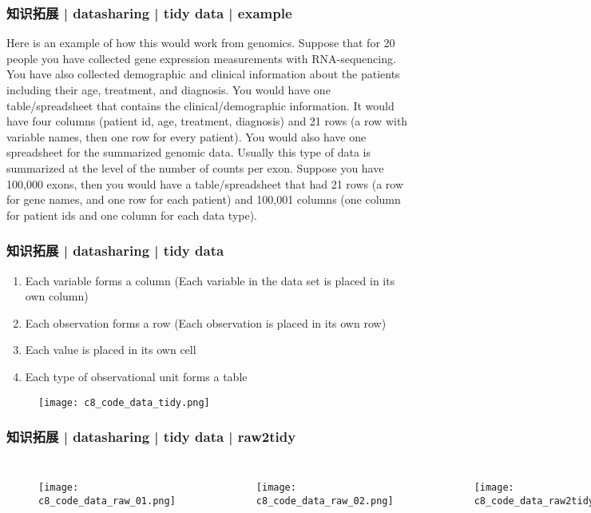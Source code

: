 \begin{frame}
  \frametitle{知识拓展 | datasharing | tidy data | example}
  Here is an example of how this would work from genomics. Suppose that for 20 people you have collected gene expression measurements with RNA-sequencing. You have also collected demographic and clinical information about the patients including their age, treatment, and diagnosis. You would have one table/spreadsheet that contains the clinical/demographic information. It would have four columns (patient id, age, treatment, diagnosis) and 21 rows (a row with variable names, then one row for every patient). You would also have one spreadsheet for the summarized genomic data. Usually this type of data is summarized at the level of the number of counts per exon. Suppose you have 100,000 exons, then you would have a table/spreadsheet that had 21 rows (a row for gene names, and one row for each patient) and 100,001 columns (one column for patient ids and one column for each data type). 
\end{frame}

\begin{frame}
  \frametitle{知识拓展 | datasharing | tidy data}
  \begin{enumerate}
    \item Each variable forms a column (Each variable in the data set is placed in its own column)
    \item Each observation forms a row (Each observation is placed in its own row)
    \item Each value is placed in its own cell
    \item Each type of observational unit forms a table
  \end{enumerate}
  \begin{figure}
    \centering
    \texttt{[image: c8\_code\_data\_tidy.png]}
  \end{figure}
\end{frame}

\begin{frame}
  \frametitle{知识拓展 | datasharing | tidy data | raw2tidy}
  \begin{columns}
  \begin{figure}
    \centering
    \texttt{[image: c8\_code\_data\_raw\_01.png]}
  \end{figure}
  \begin{figure}
    \centering
    \texttt{[image: c8\_code\_data\_raw\_02.png]}
  \end{figure}
  \begin{figure}
    \centering
    \texttt{[image: c8\_code\_data\_raw2tidy.png]}
  \end{figure}
\end{columns}
\end{frame}

